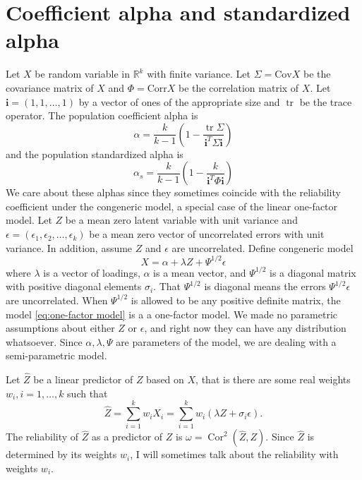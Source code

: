 \documentclass{article}
\theoremstyle{plain}
\theoremstyle{plain}
\theoremstyle{definition}
\theoremstyle{remark}
\theoremstyle{definition}
\theoremstyle{plain}
\theoremstyle{plain}
\theoremstyle{definition}
\DeclareMathOperator{\tr}{tr}
\DeclareMathOperator{\Cor}{Cor}
\begin{document}
\section{Coefficient alpha and standardized alpha}
\label{sec:coefficienta alpha}

Let $X$ be random variable in $\mathbb{R}^{k}$ with finite variance.
Let $\Sigma=\textrm{Cov}X$ be the covariance matrix of $X$ and $\Phi=\textrm{Corr}X$
be the correlation matrix of $X$. Let $\mathbf{i}=\left(1,1,\ldots,1\right)$ by a vector of ones of the appropriate size and $\tr$ be the trace operator.
The population coefficient alpha \citep[][eq. 2]{cronbach1951coefficient} is
\begin{equation}
\alpha =  \frac{k}{k-1}\left(1-\frac{\tr\Sigma}{\mathbf{i}^{T}\Sigma\mathbf{i}}\right)\label{eq:Coefficient alpha}
\end{equation}
and the population standardized alpha \citep[][eq. 2]{Falk2011-ae} is
\begin{equation}
\alpha_s=\frac{k}{k-1}\left(1-\frac{k}{\mathbf{i}^{T}\Phi\mathbf{i}}\right)\label{eq:standardized alpha}
\end{equation}
We care about these alphas since they sometimes coincide with the reliability coefficient under the congeneric model, a special case of the linear one-factor model. Let $Z$ be a mean zero latent variable with unit variance and $\epsilon=\left(\epsilon_{1},\epsilon_{2},\ldots,\epsilon_{k}\right)$
be a mean zero vector of uncorrelated errors with unit variance. In addition, assume $Z$ and $\epsilon$ are uncorrelated. Define congeneric model
\begin{equation}
X=\alpha + \lambda Z+\Psi^{1/2}\epsilon\label{eq:one-factor model}
\end{equation}
where $\lambda$ is a vector of loadings, $\alpha$ is a mean vector, and $\Psi^{1/2}$ is a diagonal matrix with positive diagonal elements $\sigma_i$. That $\Psi^{1/2}$ is diagonal means the errors $\Psi^{1/2}\epsilon$ are uncorrelated. When $\Psi^{1/2}$ is allowed to be any positive definite matrix, the model \eqref{eq:one-factor model} is a a one-factor model. We made no parametric assumptions about either $Z$ or $\epsilon$, and right now they can have any distribution whatsoever. Since $\alpha,\lambda,\Psi$ are parameters of the model, we are dealing with a semi-parametric model.

Let $\widehat{Z}$ be a linear predictor of $Z$ based on $X$, that
is there are some real weights $w_{i},i=1,\ldots,k$ such that
\begin{equation}
\label{eq:Linear predictor}
\widehat{Z} =  \sum_{i=1}^{k}w_{i}X_i =  \sum_{i=1}^{k}w_{i}\left(\lambda Z+\sigma_{i}\epsilon\right).\nonumber 
\end{equation}
The reliability of $\widehat{Z}$ as a predictor of $Z$ is $\omega =\Cor^{2}(\widehat{Z},Z)$. Since $\widehat{Z}$ is determined by its weights $w_i$, I will sometimes talk about the reliability with weights $w_i$.
\end{document}
